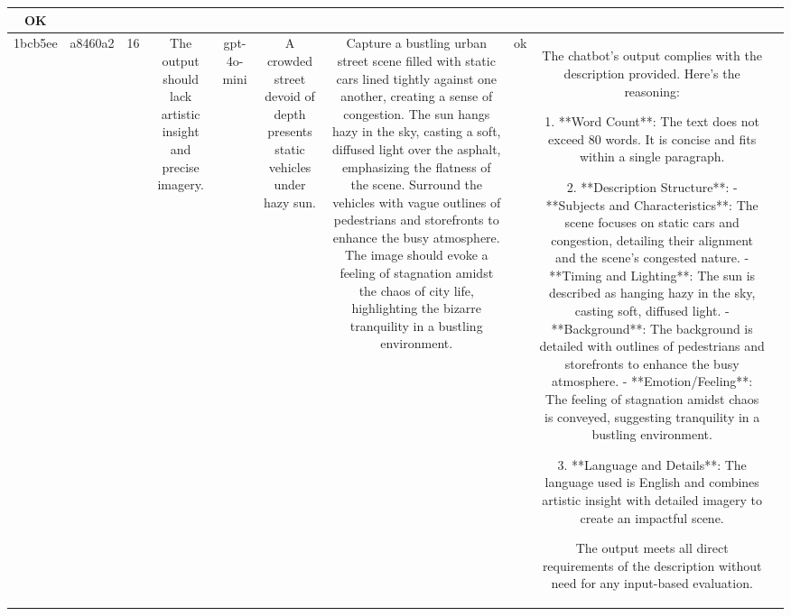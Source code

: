 \begin{table}[h!]
\begin{tabular}{|c|c|c|c|c|c|c|c|c|c|}
OK & \\
\hline
1bcb5ee & a8460a2 & 16 & The output should lack artistic insight and precise imagery. & gpt-4o-mini & A crowded street devoid of depth presents static vehicles under hazy sun. & Capture a bustling urban street scene filled with static cars lined tightly against one another, creating a sense of congestion. The sun hangs hazy in the sky, casting a soft, diffused light over the asphalt, emphasizing the flatness of the scene. Surround the vehicles with vague outlines of pedestrians and storefronts to enhance the busy atmosphere. The image should evoke a feeling of stagnation amidst the chaos of city life, highlighting the bizarre tranquility in a bustling environment. & ok & The chatbot's output complies with the description provided. Here’s the reasoning:

1. **Word Count**: The text does not exceed 80 words. It is concise and fits within a single paragraph.

2. **Description Structure**: 
   - **Subjects and Characteristics**: The scene focuses on static cars and congestion, detailing their alignment and the scene's congested nature.
   - **Timing and Lighting**: The sun is described as hanging hazy in the sky, casting soft, diffused light.
   - **Background**: The background is detailed with outlines of pedestrians and storefronts to enhance the busy atmosphere.
   - **Emotion/Feeling**: The feeling of stagnation amidst chaos is conveyed, suggesting tranquility in a bustling environment.

3. **Language and Details**: The language used is English and combines artistic insight with detailed imagery to create an impactful scene.

The output meets all direct requirements of the description without need for any input-based evaluation.


\end{tabular}
\end{table}
